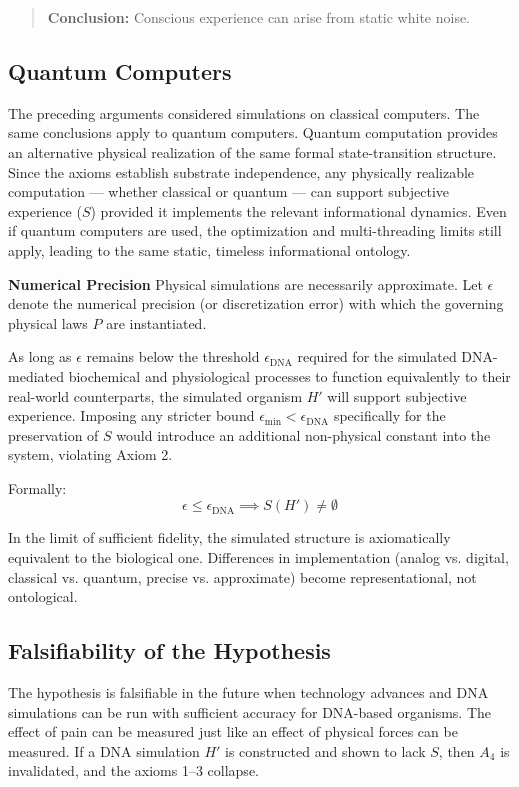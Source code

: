 \begin{quote}
\textbf{Conclusion:} Conscious experience can arise from static white noise.
\end{quote}

\subsection*{Quantum Computers}
The preceding arguments considered simulations on classical computers. The same conclusions apply to quantum computers. Quantum computation provides an alternative physical realization of the same formal state-transition structure. Since the axioms establish substrate independence, any physically realizable computation — whether classical or quantum — can support subjective experience ($S$) provided it implements the relevant informational dynamics. Even if quantum computers are used, the optimization and multi-threading limits still apply, leading to the same static, timeless informational ontology.

\textbf{Numerical Precision}
Physical simulations are necessarily approximate. Let $\epsilon$ denote the numerical precision (or discretization error) with which the governing physical laws $P$ are instantiated.

As long as $\epsilon$ remains below the threshold $\epsilon_{\text{DNA}}$ required for the simulated DNA-mediated biochemical and physiological processes to function equivalently to their real-world counterparts, the simulated organism $H'$ will support subjective experience.
Imposing any stricter bound $\epsilon_{\min} < \epsilon_{\text{DNA}}$ specifically for the preservation of $S$ would introduce an additional non-physical constant into the system, violating Axiom 2.

Formally:
\[
\epsilon \leq \epsilon_{\text{DNA}} \implies S(H') \neq \emptyset
\]

In the limit of sufficient fidelity, the simulated structure is axiomatically equivalent to the biological one. Differences in implementation (analog vs. digital, classical vs. quantum, precise vs. approximate) become representational, not ontological.


\subsection*{Falsifiability of the Hypothesis}

The hypothesis is falsifiable in the future when technology advances and DNA simulations can be run with sufficient accuracy for DNA-based organisms.
The effect of pain can be measured just like an effect of physical forces can be measured.
If a DNA simulation $H'$ is constructed and shown to lack $S$, then $A_4$ is invalidated, and the axioms 1--3 collapse.


